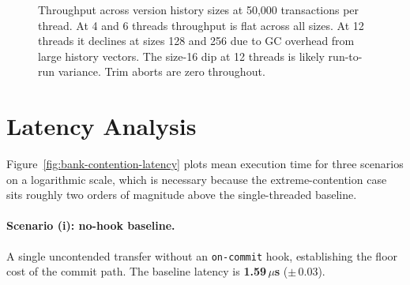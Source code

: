 \begin{figure}[H]
  \centering
  \caption{Throughput across version history sizes at 50,000 transactions per
    thread. At 4 and 6 threads throughput is flat across all sizes. At 12
    threads it declines at sizes 128 and 256 due to GC overhead from large
    history vectors. The size-16 dip at 12 threads is likely run-to-run
    variance. Trim aborts are zero throughout.}
  \label{fig:history-sweep}
\end{figure}

\section{Latency Analysis}

Figure~\ref{fig:bank-contention-latency} plots mean execution time
for three scenarios on a logarithmic scale, which is necessary because
the extreme-contention case sits roughly two orders of magnitude above
the single-threaded baseline.

\paragraph{Scenario (i): no-hook baseline.}
A single uncontended transfer without an \texttt{on-commit} hook,
establishing the floor cost of the commit path. The baseline latency
is \textbf{1.59\,$\mu$s} ($\pm$\,0.03).

